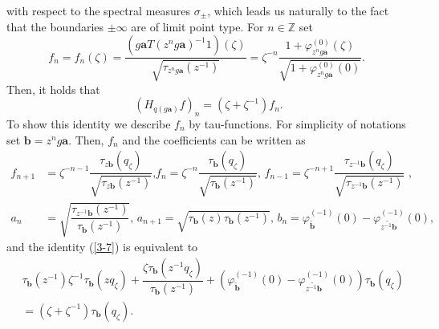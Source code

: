 \documentclass[a4paper]{article}%
\begin{document}
with respect to the spectral measures $\sigma_{\pm}$, which leads us naturally
to the fact that the boundaries $\pm\infty$ are of limit point type. For
$n\in\mathbb{Z}$ set%
\[
f_{n}=f_{n}\left(  \zeta\right)  =\frac{\left(  g\boldsymbol{a}T\left(
z^{n}g\boldsymbol{a}\right)  ^{-1}1\right)  \left(  \zeta\right)  }{\sqrt
{\tau_{z^{n}g\boldsymbol{a}}\left(  z^{-1}\right)  }}=\zeta^{-n}%
\frac{1+\varphi_{z^{n}g\boldsymbol{a}}^{\left(  0\right)  }\left(
\zeta\right)  }{\sqrt{1+\varphi_{z^{n}g\boldsymbol{a}}^{\left(  0\right)
}\left(  0\right)  }}\text{.\ }%
\]
Then, it holds that
\begin{equation}
\left(  H_{q\left(  g\boldsymbol{a}\right)  }f\right)  _{n}=\left(
\zeta+\zeta^{-1}\right)  f_{n}\text{.} \label{3-7}%
\end{equation}
To show this identity we describe $f_{n}$ by tau-functions. For simplicity of
notations set $\boldsymbol{b}=z^{n}g\boldsymbol{a}$. Then, $f_{n}$ and the
coefficients can be written as%
\begin{align*}
f_{n+1}  &  =\zeta^{-n-1}\dfrac{\tau_{z\boldsymbol{b}}\left(  q_{\zeta
}\right)  }{\sqrt{\tau_{z\boldsymbol{b}}\left(  z^{-1}\right)  }}\text{,
}f_{n}=\zeta^{-n}\dfrac{\tau_{\boldsymbol{b}}\left(  q_{\zeta}\right)  }%
{\sqrt{\tau_{\boldsymbol{b}}\left(  z^{-1}\right)  }}\text{, }f_{n-1}%
=\zeta^{-n+1}\dfrac{\tau_{z^{-1}\boldsymbol{b}}\left(  q_{\zeta}\right)
}{\sqrt{\tau_{z^{-1}\boldsymbol{b}}\left(  z^{-1}\right)  }}\text{\ ,}\\
a_{n}  &  =\sqrt{\dfrac{\tau_{z^{-1}\boldsymbol{b}}\left(  z^{-1}\right)
}{\tau_{\boldsymbol{b}}\left(  z^{-1}\right)  }}\text{, \ }a_{n+1}=\sqrt
{\tau_{\boldsymbol{b}}\left(  z\right)  \tau_{\boldsymbol{b}}\left(
z^{-1}\right)  }\text{, \ }b_{n}=\varphi_{\widetilde{\boldsymbol{b}}}^{\left(
-1\right)  }\left(  0\right)  -\varphi_{\widetilde{z^{-1}\boldsymbol{b}}%
}^{\left(  -1\right)  }\left(  0\right)  \text{,}%
\end{align*}
and the identity (\ref{3-7}) is equivalent to%
\begin{align}
&  \tau_{\boldsymbol{b}}\left(  z^{-1}\right)  \zeta^{-1}\tau_{\boldsymbol{b}%
}\left(  zq_{\zeta}\right)  +\dfrac{\zeta\tau_{\boldsymbol{b}}\left(
z^{-1}q_{\zeta}\right)  }{\tau_{\boldsymbol{b}}\left(  z^{-1}\right)
}+\left(  \varphi_{\widetilde{\boldsymbol{b}}}^{\left(  -1\right)  }\left(
0\right)  -\varphi_{\widetilde{z^{-1}\boldsymbol{b}}}^{\left(  -1\right)
}\left(  0\right)  \right)  \tau_{\boldsymbol{b}}\left(  q_{\zeta}\right)
\nonumber\\
&  =\left(  \zeta+\zeta^{-1}\right)  \tau_{\boldsymbol{b}}\left(  q_{\zeta
}\right)  \text{.} \label{3-8}%
\end{align}
\end{document}

